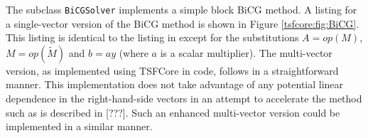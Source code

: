 The subclass {}\texttt{BiCG\-Solver} implements a simple block BiCG
method.  A listing for a single-vector version of the BiCG method is
shown in Figure {}\ref{tsfcore:fig:BiCG}.  This listing is identical
to the listing in {}\cite{ref:tmpls_for_iter_systems} except for the
substitutions $A = op(M)$, $M = op(\tilde{M})$ and $b =a y$ (where $a$
is a scalar multiplier).  The multi-vector version, as implemented
using TSFCore in code, follows in a straightforward manner.  This
implementation does not take advantage of any potential linear
dependence in the right-hand-side vectors in an attempt to accelerate
the method such as is described in [???].  Such an enhanced
multi-vector version could be implemented in a similar manner.

\begin{figure}
\begin{center}
\end{center}
\end{figure}
